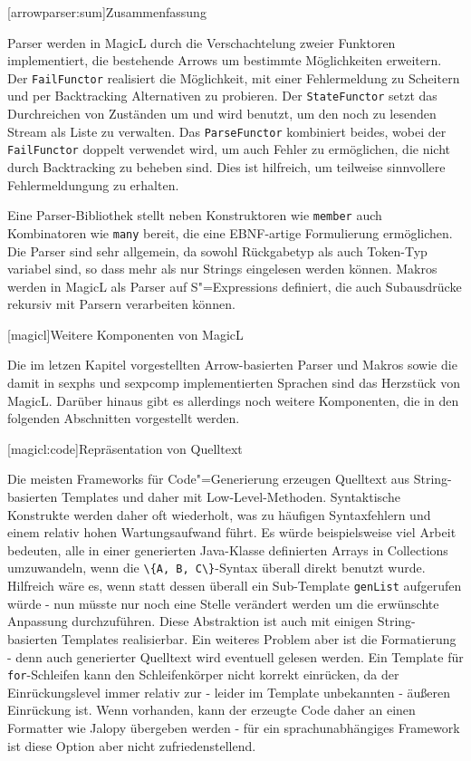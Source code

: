 \documentclass[11pt, a4paper, bibgerm]{scrbook}
\newcommand\icode[1]{\lstinline?#1?}
\newcommand\lchapter{}
\newcommand\lsection{}
\newcommand\cref{}
\newcommand{\sexps}{S"=Expressions}
\newcommand{\cgen}{Code"=Generierung}
\begin{document}
\lsection[arrowparser:sum]{Zusammenfassung}

Parser werden in MagicL durch die Verschachtelung zweier Funktoren
implementiert, die bestehende Arrows um bestimmte Möglichkeiten
erweitern. Der \icode{FailFunctor} realisiert die Möglichkeit, mit einer
Fehlermeldung zu Scheitern und per Backtracking Alternativen zu
probieren. Der \icode{StateFunctor} setzt das Durchreichen von Zuständen
um und wird benutzt, um den noch zu lesenden Stream als Liste zu
verwalten. Das \icode{ParseFunctor} kombiniert beides, wobei der
\icode{FailFunctor} doppelt verwendet wird, um auch Fehler zu
ermöglichen, die nicht durch Backtracking zu beheben sind. Dies ist
hilfreich, um teilweise sinnvollere Fehlermeldungung zu erhalten.

Eine Parser-Bibliothek stellt neben Konstruktoren wie \icode{member}
auch Kombinatoren wie \icode{many} bereit, die eine EBNF-artige
Formulierung ermöglichen. Die Parser sind sehr allgemein, da sowohl
Rückgabetyp als auch Token-Typ variabel sind, so dass mehr als nur
Strings eingelesen werden können. Makros werden in MagicL als Parser auf
\sexps{} definiert, die auch Subausdrücke rekursiv mit Parsern
verarbeiten können.

\lchapter[magicl]{Weitere Komponenten von MagicL}

Die im letzen Kapitel vorgestellten Arrow-basierten Parser und Makros
sowie die damit in \cref{sexphs} und \cref{sexpcomp} implementierten
Sprachen sind das Herzstück von MagicL. Darüber hinaus gibt es
allerdings noch weitere Komponenten, die in den folgenden Abschnitten
vorgestellt werden.

\lsection[magicl:code]{Repräsentation von Quelltext}

Die meisten Frameworks für \cgen{} erzeugen Quelltext aus
String-basierten Templates und daher mit
Low-Level-Methoden. Syntaktische Konstrukte werden daher oft wiederholt,
was zu häufigen Syntaxfehlern und einem relativ hohen Wartungsaufwand
führt. Es würde beispielsweise viel Arbeit bedeuten, alle in einer
generierten Java-Klasse definierten Arrays in Collections umzuwandeln,
wenn die \icode{\{A, B, C\}}-Syntax überall direkt benutzt
wurde. Hilfreich wäre es, wenn statt dessen überall ein Sub-Template
\icode{genList} aufgerufen würde - nun müsste nur noch eine Stelle
verändert werden um die erwünschte Anpassung durchzuführen. Diese
Abstraktion ist auch mit einigen String-basierten Templates
realisierbar. Ein weiteres Problem aber ist die Formatierung - denn auch
generierter Quelltext wird eventuell gelesen werden. Ein Template für
\icode{for}-Schleifen kann den Schleifenkörper nicht korrekt einrücken,
da der Einrückungslevel immer relativ zur - leider im Template
unbekannten - äußeren Einrückung ist.  Wenn vorhanden, kann der erzeugte
Code daher an einen Formatter wie Jalopy\cite{Jalopy} übergeben werden -
für ein sprachunabhängiges Framework ist diese Option aber nicht
zufriedenstellend.
\end{document}
